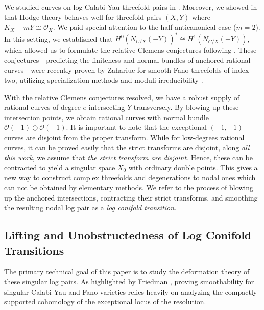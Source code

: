\documentclass[11pt]{article}
\theoremstyle{definition}
\newcommand{\OO}{\mathcal{O}}
\begin{document}
We studied curves on log Calabi-Yau threefold pairs in \cite{AGG24b}. Moreover, we showed in \cite{A25} that Hodge theory behaves well for threefold pairs $(X,Y)$ where $K_X+mY\cong \OO_X$. We paid special attention to the half-anticanonical case ($m=2$). In this setting, we established that $H^0(N_{C/X}(-Y))^*\cong H^1(N_{C/X}(-Y))$, which allowed us to formulate the relative Clemens conjectures following \cite{C87}. These conjectures—predicting the finiteness and normal bundles of anchored rational curves—were recently proven by Zahariuc \cite{A26b} for smooth Fano threefolds of index two, utilizing specialization methods \cite{Z18} and moduli irreducibility \cite{LT19}.

With the relative Clemens conjectures resolved, we have a robust supply of rational curves of degree $e$ intersecting $Y$ transversely. By blowing up these intersection points, we obtain rational curves with normal bundle $\OO(-1)\oplus \OO(-1)$. It is important to note that the exceptional $(-1,-1)$ curves are disjoint from the proper transform.
While for low-degrees rational curves, it can be proved easily that the strict transforms are disjoint, along \emph{all this work}, we assume that \emph{the strict transform are disjoint}.
Hence, these can be contracted to yield a singular space $X_0$ with ordinary double points. This gives a new way to construct complex threefolds and degenerations to nodal ones which can not be obtained by elementary methods. We refer to the process of blowing up the anchored intersections, contracting their strict transforms, and smoothing the resulting nodal log pair as a \textit{log conifold transition}.

\subsection{Lifting and Unobstructedness of Log Conifold Transitions}
The primary technical goal of this paper is to study the deformation theory of these singular log pairs. As highlighted by Friedman \cite{F26}, proving smoothability for singular Calabi-Yau and Fano varieties relies heavily on analyzing the compactly supported cohomology of the exceptional locus of the resolution.
\end{document}
